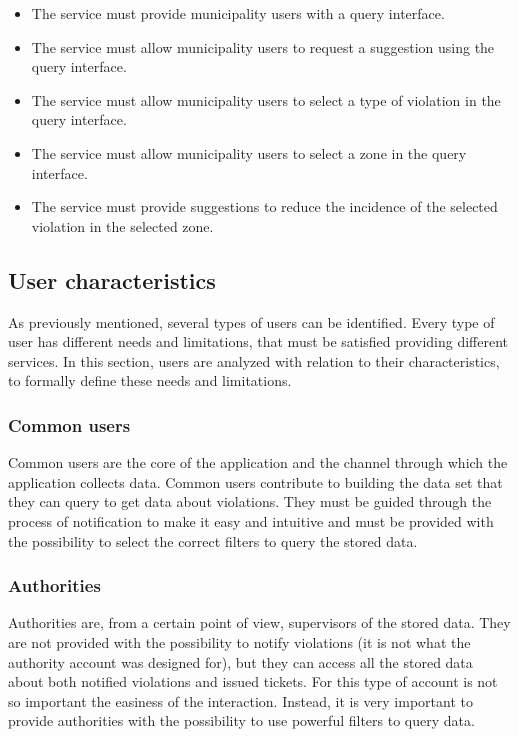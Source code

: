 \documentclass[./main.tex]{subfiles}
\begin{document}
\begin{itemize}
\item
  The service must provide municipality users with a query interface.
\item
  The service must allow municipality users to request a suggestion
  using the query interface.
\item
  The service must allow municipality users to select a type of
  violation in the query interface.
\item
  The service must allow municipality users to select a zone in the
  query interface.
\item
  The service must provide suggestions to reduce the incidence of the
  selected violation in the selected zone.
\end{itemize}

\subsection{User characteristics}

As previously mentioned, several types of users can be identified. Every
type of user has different needs and limitations, that must be satisfied
providing different services. In this section, users are analyzed with
relation to their characteristics, to formally define these needs and
limitations.

\subsubsection{Common users}

Common users are the core of the application and the channel through
which the application collects data. Common users contribute to building
the data set that they can query to get data about violations. They must
be guided through the process of notification to make it easy and
intuitive and must be provided with the possibility to select the
correct filters to query the stored data.

\subsubsection{Authorities}

Authorities are, from a certain point of view, supervisors of the stored
data. They are not provided with the possibility to notify violations
(it is not what the authority account was designed for), but they can
access all the stored data about both notified violations and issued
tickets. For this type of account is not so important the easiness of
the interaction. Instead, it is very important to provide authorities
with the possibility to use powerful filters to query data.
\end{document}
